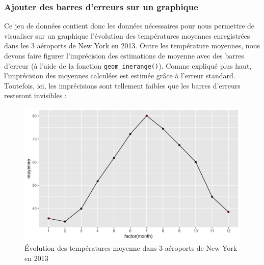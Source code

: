 \documentclass[a4paperpaper,]{article}
\newenvironment{Shaded}{\begin{snugshade}}{\end{snugshade}}
\newcommand{\DataTypeTok}[1]{\textcolor[rgb]{0.00,0.34,0.68}{#1}}
\newcommand{\DecValTok}[1]{\textcolor[rgb]{0.69,0.50,0.00}{#1}}
\newcommand{\KeywordTok}[1]{\textcolor[rgb]{0.12,0.11,0.11}{\textbf{#1}}}
\newcommand{\NormalTok}[1]{\textcolor[rgb]{0.12,0.11,0.11}{#1}}
\newcommand{\OperatorTok}[1]{\textcolor[rgb]{0.12,0.11,0.11}{#1}}
\newcommand{\StringTok}[1]{\textcolor[rgb]{0.75,0.01,0.01}{#1}}
\theoremstyle{definition}
\theoremstyle{definition}
\theoremstyle{definition}
\theoremstyle{remark}
\begin{document}
\hypertarget{ajouter-des-barres-derreurs-sur-un-graphique}{%
\subsubsection{Ajouter des barres d'erreurs sur un
graphique}\label{ajouter-des-barres-derreurs-sur-un-graphique}}

Ce jeu de données contient donc les données nécessaires pour nous
permettre de visualiser sur un graphique l'évolution des températures
moyennes enregistrées dans les 3 aéroports de New York en 2013. Outre
les température moyennes, nous devons faire figurer l'imprécision des
estimations de moyenne avec des barres d'erreur (à l'aide de la fonction
\texttt{geom\_inerange()}). Comme expliqué plus haut, l'imprécision des
moyennes calculées est estimée grâce à l'erreur standard. Toutefois,
ici, les imprécisions sont tellement faibles que les barres d'erreurs
resteront invisibles :

\begin{Shaded}
\end{Shaded}

\begin{figure}[htpb]

{\centering \includegraphics[width=0.9\linewidth]{figure/errorbars-1} 

}

\caption{Évolution des températures moyenne dans 3 aéroports de New York en 2013}\label{fig:errorbars}
\end{figure}
\end{document}

